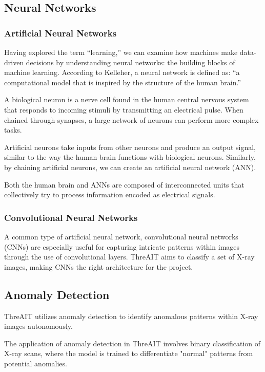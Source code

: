 \documentclass{article}
\begin{document}
\subsection{Neural Networks}

\subsubsection{Artificial Neural Networks}
Having explored the term “learning,” we can examine how machines make data-driven decisions by understanding neural networks: the building blocks of machine learning. According to Kelleher, a neural network is defined as:
“a computational model that is inspired by the structure of the human brain.” \cite{mit_book}

A biological neuron is a nerve cell found in the human central nervous system that responds to incoming stimuli by transmitting an electrical pulse. When chained through synapses, a large network of neurons can perform more complex tasks.

Artificial neurons take inputs from other neurons and produce an output signal, similar to the way the human brain functions with biological neurons. Similarly, by chaining artificial neurons, we can create an artificial neural network (ANN).

Both the human brain and ANNs are composed of interconnected units that collectively try to process information encoded as electrical signals.

\subsubsection{Convolutional Neural Networks}
A common type of artificial neural network, convolutional neural networks (CNNs) are especially useful for capturing intricate patterns within images through the use of convolutional layers. ThreAIT aims to classify a set of X-ray images, making CNNs the right architecture for the project. 

\subsection{Anomaly Detection}

ThreAIT utilizes anomaly detection to identify anomalous patterns within X-ray images autonomously.

The application of anomaly detection in ThreAIT involves binary classification of X-ray scans, where the model is trained to differentiate "normal" patterns from potential anomalies.
\end{document}
